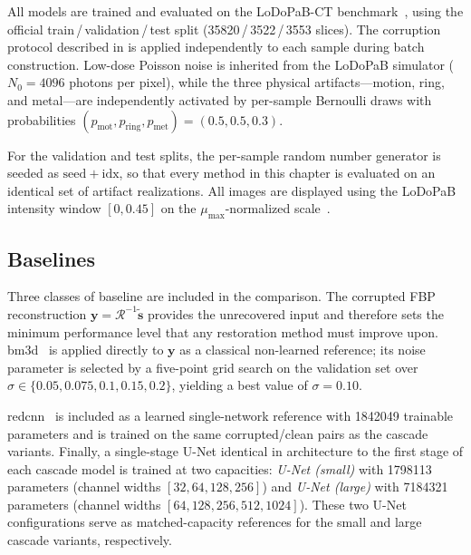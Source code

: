 All models are trained and evaluated on the LoDoPaB-CT benchmark~\cite{Leuschner2021}, using the official train\,/\,validation\,/\,test split (\num{35820}\,/\,\num{3522}\,/\,\num{3553} slices). The corruption protocol described in  is applied independently to each sample during batch construction. Low-dose Poisson noise is inherited from the LoDoPaB simulator (\(N_0=\num{4096}\) photons per pixel), while the three physical artifacts---motion, ring, and metal---are independently activated by per-sample Bernoulli draws with probabilities \((p_\mathrm{mot}, p_\mathrm{ring}, p_\mathrm{met}) = (0.5, 0.5, 0.3)\).

For the validation and test splits, the per-sample random number generator is seeded as \(\mathrm{seed}+\mathrm{idx}\), so that every method in this chapter is evaluated on an identical set of artifact realizations. All images are displayed using the LoDoPaB intensity window \([0, 0.45]\) on the \(\mu_{\max}\)-normalized scale~\cite{Leuschner2021}.
\subsection{Baselines}
\label{subsec:exp_baselines}

Three classes of baseline are included in the comparison. The corrupted FBP reconstruction $\mathbf{y} = \mathcal{R}^{-1}\tilde{\mathbf{s}}$ provides the unrecovered input and therefore sets the minimum performance level that any restoration method must improve upon. \gls{bm3d}~\cite{Dabov2007} is applied directly to $\mathbf{y}$ as a classical non-learned reference; its noise parameter is selected by a five-point grid search on the validation set over $\sigma \in \{0.05, 0.075, 0.1, 0.15, 0.2\}$, yielding a best value of $\sigma = 0.10$.

\gls{redcnn}~\cite{Chen2017} is included as a learned single-network reference with \num{1842049} trainable parameters and is trained on the same corrupted/clean pairs as the cascade variants. Finally, a single-stage U-Net identical in architecture to the first stage of each cascade model is trained at two capacities: \emph{U-Net (small)} with \num{1798113} parameters (channel widths $[32, 64, 128, 256]$) and \emph{U-Net (large)} with \num{7184321} parameters (channel widths $[64, 128, 256, 512, 1024]$). These two U-Net configurations serve as matched-capacity references for the small and large cascade variants, respectively.
